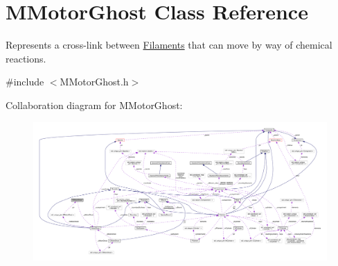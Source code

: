 \hypertarget{classMMotorGhost}{\section{M\+Motor\+Ghost Class Reference}
\label{classMMotorGhost}
}


Represents a cross-\/link between \hyperlink{classFilament}{Filaments} that can move by way of chemical reactions.  




{\ttfamily \#include $<$M\+Motor\+Ghost.\+h$>$}



Collaboration diagram for M\+Motor\+Ghost\+:\nopagebreak
\begin{figure}[H]
\begin{center}
\leavevmode
\includegraphics[width=350pt]{classMMotorGhost__coll__graph}
\end{center}
\end{figure}
